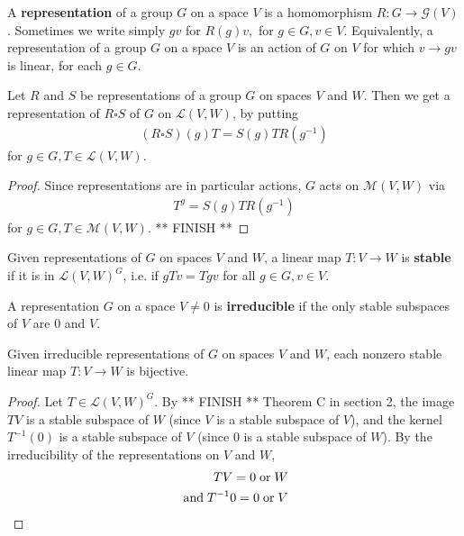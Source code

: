 \documentclass{../mathnotes}
\begin{document}
\begin{defn}
    A \textbf{representation} of a group $G$ on a space $V$ is a homomorphism $R:G\to\mathcal{G}(V)$. Sometimes we write simply $gv$ for $R(g)v,$ for $g\in G, v\in V$.
    Equivalently, a representation of a group $G$ on a space $V$ is an action of $G$ on $V$ for which $v\to gv$ is linear, for each $g\in G$.
\end{defn}

\begin{thm}
    Let $R$ and $S$ be representations of a group $G$ on spaces $V$ and $W$. Then we get a representation of $R\square S$ of $G$ on $\mathcal{L}(V,W)$, by putting
    \begin{align*}
        (R\square S)(g)T=S(g)TR(g^{-1})
    \end{align*}
    for $g\in G,T\in\mathcal{L}(V,W)$.
\end{thm}
\begin{proof}
    Since representations are in particular actions, $G$ acts on $\mathcal{M}(V,W)$ via
    \begin{align*}
        T^g=S(g)TR(g^{-1})
    \end{align*}
    for $g\in G, T\in\mathcal{M}(V,W)$.
    ** FINISH **
\end{proof}

\begin{defn}
    Given representations of $G$ on spaces $V$ and $W$, a linear map $T:V\to W$ is \textbf{stable} if it is in $\mathcal{L}(V,W)^G$, i.e. if
    $gTv=Tgv$ for all $g\in G, v\in V$.
\end{defn}

\begin{defn}
    A representation $G$ on a space $V\neq 0$ is \textbf{irreducible} if the only stable subspaces of $V$ are 0 and $V$.
\end{defn}

\begin{lem}
    Given irreducible representations of $G$ on spaces $V$ and $W$, each nonzero stable linear map $T:V\to W$ is bijective.
\end{lem}
\begin{proof}
    Let $T\in\mathcal{L}(V,W)^G$. By ** FINISH ** Theorem C in section 2, the image $TV$ is a stable subspace of $W$ (since $V$ is a stable subspace of $V$),
    and the kernel $T^{-1}(0)$ is a stable subspace of $V$ (since 0 is a stable subspace of $W$). By the irreducibility of the representations on $V$ and $W$,
    \begin{align*}
        TV=0\;\textnormal{or}\;W\\
        \;\textnormal{and}\; T^{-1}0=0 \;\textnormal{or}\; V
    \end{align*}
\end{proof}
\end{document}
